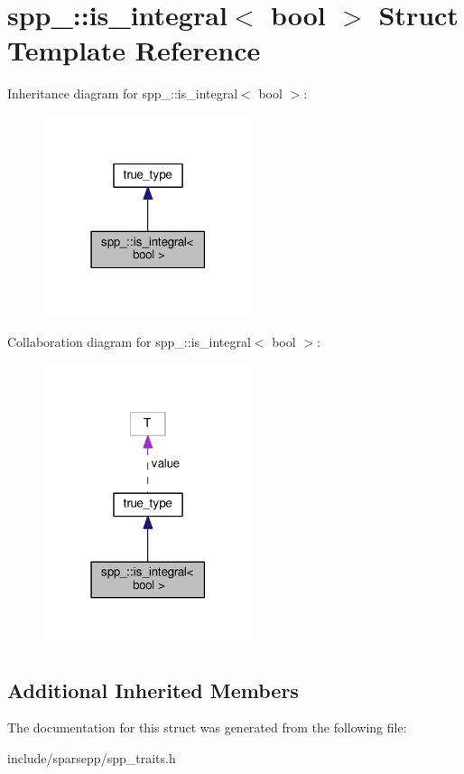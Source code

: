 \hypertarget{structspp___1_1is__integral_3_01bool_01_4}{}\section{spp\+\_\+\+:\+:is\+\_\+integral$<$ bool $>$ Struct Template Reference}
\label{structspp___1_1is__integral_3_01bool_01_4}


Inheritance diagram for spp\+\_\+\+:\+:is\+\_\+integral$<$ bool $>$\+:\nopagebreak
\begin{figure}[H]
\begin{center}
\leavevmode
\includegraphics[width=174pt]{structspp___1_1is__integral_3_01bool_01_4__inherit__graph}
\end{center}
\end{figure}


Collaboration diagram for spp\+\_\+\+:\+:is\+\_\+integral$<$ bool $>$\+:\nopagebreak
\begin{figure}[H]
\begin{center}
\leavevmode
\includegraphics[width=174pt]{structspp___1_1is__integral_3_01bool_01_4__coll__graph}
\end{center}
\end{figure}
\subsection*{Additional Inherited Members}


The documentation for this struct was generated from the following file\+:\begin{DoxyCompactItemize}
\item 
include/sparsepp/spp\+\_\+traits.\+h\end{DoxyCompactItemize}
